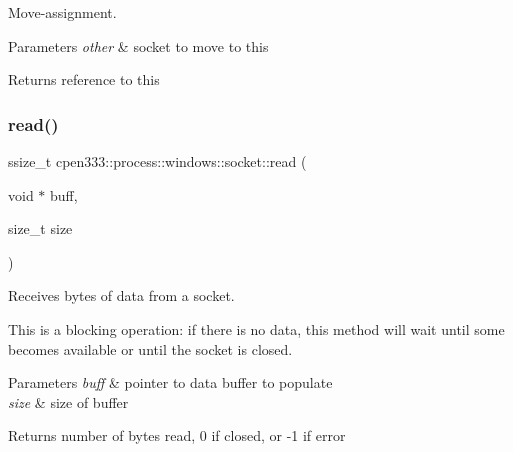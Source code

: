 Move-\/assignment. 


\begin{DoxyParams}{Parameters}
{\em other} & socket to move to this \\
\hline
\end{DoxyParams}
\begin{DoxyReturn}{Returns}
reference to this 
\end{DoxyReturn}
\mbox{\label{classcpen333_1_1process_1_1windows_1_1socket_ab7445d28dd8866ee19d7ed4e35a8ba10}} 
\subsubsection{\texorpdfstring{read()}{read()}}
{\footnotesize\ttfamily ssize\+\_\+t cpen333\+::process\+::windows\+::socket\+::read (\begin{DoxyParamCaption}\item[{void $\ast$}]{buff,  }\item[{size\+\_\+t}]{size }\end{DoxyParamCaption})\hspace{0.3cm}{\ttfamily [inline]}}



Receives bytes of data from a socket. 

This is a blocking operation\+: if there is no data, this method will wait until some becomes available or until the socket is closed.


\begin{DoxyParams}{Parameters}
{\em buff} & pointer to data buffer to populate \\
\hline
{\em size} & size of buffer \\
\hline
\end{DoxyParams}
\begin{DoxyReturn}{Returns}
number of bytes read, 0 if closed, or -\/1 if error 
\end{DoxyReturn}
\mbox{\label{classcpen333_1_1process_1_1windows_1_1socket_add8c60c2bff8d2c4339e38e2bb92f6d7}} 
